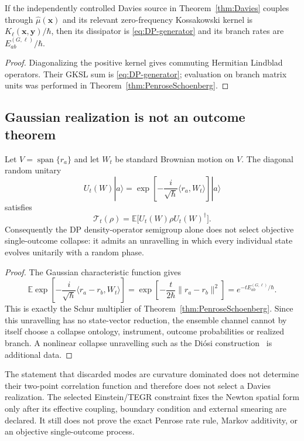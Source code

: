 \documentclass[11pt]{article}
\newcommand{\T}{\mathcal T}
\begin{document}
\begin{corollary}\label{cor:DPDavies}
If the independently controlled Davies source in
Theorem~\ref{thm:Davies} couples through $\widehat\mu(\mathbf x)$ and its relevant
zero-frequency Kossakowski kernel is
$K_\ell(\mathbf x,\mathbf y)/\hbar$, then its dissipator is
\eqref{eq:DP-generator} and its branch rates are
$E_{ab}^{(G,\ell)}/\hbar$.
\end{corollary}

\begin{proof}
Diagonalizing the positive kernel gives commuting Hermitian Lindblad operators.
Their GKSL sum is \eqref{eq:DP-generator}; evaluation on branch matrix units was
performed in Theorem~\ref{thm:PenroseSchoenberg}.
\end{proof}

\subsection{Gaussian realization is not an outcome theorem}

\begin{proposition}
\label{prop:unravelling}
Let $V=\operatorname{span}\{r_a\}$ and let $W_t$ be standard Brownian motion on
$V$. The diagonal random unitary
\[
 U_t(W)|a\rangle=
 \exp\!\left[-\frac{i}{\sqrt\hbar}\langle r_a,W_t\rangle\right]|a\rangle
\]
satisfies
\[
 \T_t(\rho)=\mathbb E\bigl[U_t(W)\rho U_t(W)^\dagger\bigr].
\]
Consequently the DP density-operator semigroup alone does not select objective
single-outcome collapse: it admits an unravelling in which every individual state
evolves unitarily with a random phase.
\end{proposition}

\begin{proof}
The Gaussian characteristic function gives
\[
 \mathbb E\exp\!\left[-\frac{i}{\sqrt\hbar}
 \langle r_a-r_b,W_t\rangle\right]
 =\exp\!\left[-\frac{t}{2\hbar}\|r_a-r_b\|^2\right]
 =e^{-tE_{ab}^{(G,\ell)}/\hbar}.
\]
This is exactly the Schur multiplier of
Theorem~\ref{thm:PenroseSchoenberg}. Since this unravelling has no state-vector
reduction, the ensemble channel cannot by itself choose a collapse ontology,
instrument, outcome probabilities or realized branch. A nonlinear collapse
unravelling such as the Di\'osi construction~\cite{Diosi1989} is additional data.
\end{proof}

\begin{corollary}
The statement that discarded modes are curvature dominated does not determine their
two-point correlation function and therefore does not select a Davies realization.
The selected Einstein/TEGR constraint fixes the Newton spatial form only after its
effective coupling, boundary condition and external smearing are declared. It still
does not prove the exact Penrose rate rule, Markov additivity, or an objective
single-outcome process.
\end{corollary}
\end{document}
